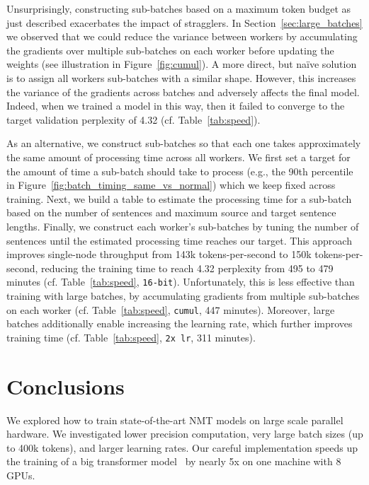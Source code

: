 \documentclass[11pt,a4paper]{article}
\begin{document}
Unsurprisingly, constructing sub-batches based on a maximum token budget as just described exacerbates the impact of stragglers.
In Section~\ref{sec:large_batches} we observed that we could reduce the variance between workers by accumulating the gradients over multiple sub-batches on each worker before updating the weights (see illustration in Figure~\ref{fig:cumul}).
A more direct, but na\"ive solution is to assign all workers sub-batches with a similar shape.
However, this increases the variance of the gradients across batches and adversely affects the final model.
Indeed, when we trained a model in this way, then it failed to converge to the target validation perplexity of 4.32 (cf. Table~\ref{tab:speed}).

As an alternative, we construct sub-batches so that each one takes approximately the same amount of processing time across all workers.
We first set a target for the amount of time a sub-batch should take to process (e.g., the 90th percentile in Figure~\ref{fig:batch_timing_same_vs_normal}) which we keep fixed across training.
Next, we build a table to estimate the processing time for a sub-batch based on the number of sentences and maximum source and target sentence lengths.
Finally, we construct each worker's sub-batches by tuning the number of sentences until the estimated processing time reaches our target.
This approach improves single-node throughput from 143k tokens-per-second to 150k tokens-per-second, reducing the training time to reach 4.32 perplexity from 495 to 479 minutes (cf. Table~\ref{tab:speed}, \texttt{16-bit}).
Unfortunately, this is less effective than training with large batches, by accumulating gradients from multiple sub-batches on each worker (cf. Table~\ref{tab:speed}, \texttt{cumul}, 447 minutes).
Moreover, large batches additionally enable increasing the learning rate, which further improves training time (cf. Table~\ref{tab:speed}, \texttt{2x lr}, 311 minutes).

\section{Conclusions}

We explored how to train state-of-the-art NMT models on large scale parallel hardware. We investigated lower precision computation, very large batch sizes (up to 400k tokens), and larger learning rates. Our careful implementation speeds up the training of a big transformer model~\citep{vaswani2017transformer} by nearly 5x on one machine with 8 GPUs. 
\end{document}
